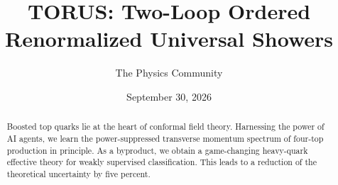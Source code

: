 \documentclass[11pt]{article}
\title{TORUS: Two-Loop Ordered Renormalized Universal Showers}
\author{The Physics Community}
\date{September 30, 2026}
\numberwithin{equation}{section}
\theoremstyle{definition}
\theoremstyle{remark}
\begin{document}
\maketitle
\begin{abstract}
Boosted top quarks lie at the heart of conformal field theory.
Harnessing the power of AI agents, we learn the power-suppressed
transverse momentum spectrum of four-top production in principle. As a
byproduct, we obtain a game-changing heavy-quark effective theory for
weakly supervised classification. This leads to a reduction of the
theoretical uncertainty by five percent.
\end{abstract}
\tableofcontents





\nocite{*}


\end{document}

